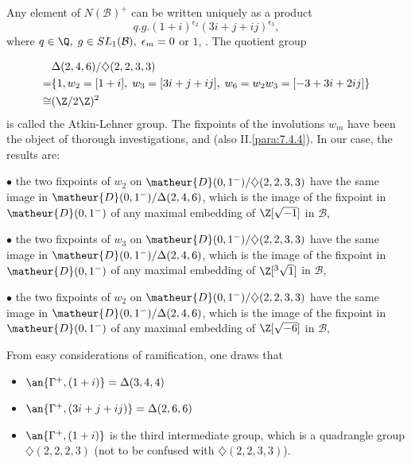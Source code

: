 \begin{para}\label{para::6.2.2} Any element of $N(\mathcal{B})^+$ can be
 written uniquely as a product 
\begin{equation*}
 q.g.(1+i)^{\epsilon_2}(3i+j+ij)^{\epsilon_3},
\end{equation*}
where $q\in \Q, \; g\in SL_1(\mathcal{B}),\;\epsilon_m=0 $
or $1$, \cf \cite{michon84:_courb_shimur}. The quotient group 

 \begin{align*}
  &\Delta(2,4,6)/\diamondsuit(2,2,3,3)\\
  = &\{1,w_2=[1+i],\;w_3=[3i+j+ij],\; w_6=w_2w_3=[-3+3i+2ij]\}\\
  \cong &(\Z/2\Z)^2
 \end{align*}
 is called the Atkin-Lehner group. The fixpoints of the involutions $w_m$
 have been the object of thorough 
 investigations,  and \cite{shimura67:_const} (\cf also
 II.\ref{para:7.4.4}). In our case, the results are:

 $\bullet$ the two fixpoints of $w_2$ on $\matheur{D}(0,1^-)/\diamondsuit
 (2,2,3,3)$ have the same image in $\matheur{D}(0,1^-)/\Delta(2,4,6)$, which is the
 image of the fixpoint in $\matheur{D}(0,1^-)$ of any maximal 
 embedding of $\Z[\sqrt {-1}]$ in $\mathcal{B}$, 

$\bullet$ the two fixpoints of $w_3$ on $\matheur{D}(0,1^-)/\diamondsuit
(2,2,3,3)$ have the same image in $\matheur{D}(0,1^-)/\Delta(2,4,6)$, which is the
image of the fixpoint in $\matheur{D}(0,1^-)$ of any maximal 
embedding of $\Z[^3\sqrt{1}]$ in $\mathcal{B}$, 

$\bullet$ the two fixpoints of $w_2$ on $\matheur{D}(0,1^-)/\diamondsuit
(2,2,3,3)$ have the same image in $\matheur{D}(0,1^-)/\Delta(2,4,6)$, which is the
image of the fixpoint in $\matheur{D}(0,1^-)$ of any maximal 
embedding of $\Z[\sqrt {-6}]$ in $\mathcal{B}$, 

 From easy considerations of ramification, one draws that 

\begin{itemize}
 \item $\an{\Gamma^+,(1+i)}=\Delta (3,4,4)$
 \item $\an{\Gamma^+,(3i+j+ij)}=\Delta (2,6,6)$
 \item $\an{\Gamma^+,(1+i)}$ is the third intermediate group, which is
       a quadrangle group $\diamondsuit 
       (2,2,2,3)$ (not to be confused with $\diamondsuit (2,2,3,3)$).
\end{itemize}
\end{para}

